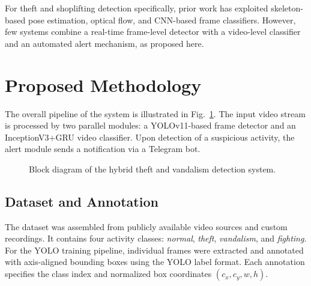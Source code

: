 \documentclass[runningheads]{llncs}
\begin{document}
For theft and shoplifting detection specifically, prior work has exploited skeleton-based pose estimation, optical flow, and CNN-based frame classifiers. However, few systems combine a real-time frame-level detector with a video-level classifier and an automated alert mechanism, as proposed here.

\section{Proposed Methodology}
\label{sec:method}

The overall pipeline of the system is illustrated in Fig.~\ref{fig:block}. The input video stream is processed by two parallel modules: a YOLOv11-based frame detector and an InceptionV3+GRU video classifier. Upon detection of a suspicious activity, the alert module sends a notification via a Telegram bot.

\begin{figure}[t]
\centering
{}
\caption{Block diagram of the hybrid theft and vandalism detection system.}
\label{fig:block}
\end{figure}

\subsection{Dataset and Annotation}

The dataset was assembled from publicly available video sources and custom recordings. It contains four activity classes: \textit{normal}, \textit{theft}, \textit{vandalism}, and \textit{fighting}. For the YOLO training pipeline, individual frames were extracted and annotated with axis-aligned bounding boxes using the YOLO label format. Each annotation specifies the class index and normalized box coordinates $(c_x, c_y, w, h)$.
\end{document}
